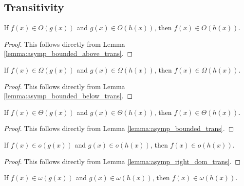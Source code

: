 \subsection{Transitivity}

\begin{lemma}
    \label{lemma:big_o_trans}
    \leanok
    If $f(x) \in O(g(x))$ and $g(x) \in O(h(x))$, then $f(x) \in O(h(x))$.
\end{lemma}

\begin{proof}
    \leanok
    This follows directly from Lemma \ref{lemma:asymp_bounded_above_trans}.
\end{proof}

\begin{lemma}
    \label{lemma:big_omega_trans}
    \leanok
    If $f(x) \in \Omega(g(x))$ and $g(x) \in \Omega(h(x))$, then $f(x) \in \Omega(h(x))$.
\end{lemma}

\begin{proof}
    \leanok
    This follows directly from Lemma \ref{lemma:asymp_bounded_below_trans}.
\end{proof}

\begin{lemma}
    \label{lemma:theta_trans}
    \leanok
    If $f(x) \in \Theta(g(x))$ and $g(x) \in \Theta(h(x))$, then $f(x) \in \Theta(h(x))$.
\end{lemma}

\begin{proof}
    \leanok
    This follows directly from Lemma \ref{lemma:asymp_bounded_trans}.
\end{proof}

\begin{lemma}
    \label{lemma:small_o_trans}
    \leanok
    If $f(x) \in o(g(x))$ and $g(x) \in o(h(x))$, then $f(x) \in o(h(x))$. 
\end{lemma}

\begin{proof}
    \leanok
    This follows directly from Lemma \ref{lemma:asymp_right_dom_trans}.
\end{proof}

\begin{lemma}
    \label{lemma:small_omega_trans}
    \leanok
    If $f(x) \in \omega(g(x))$ and $g(x) \in \omega(h(x))$, then $f(x) \in \omega(h(x))$.
\end{lemma}

